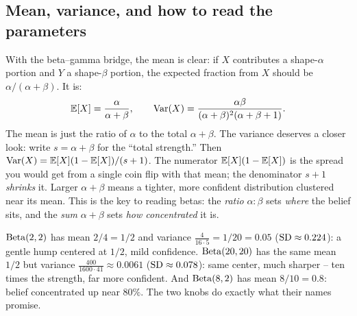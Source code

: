 \subsection{Mean, variance, and how to read the parameters}
With the beta--gamma bridge, the mean is clear: if $X$ contributes a
shape-$\alpha$ portion and $Y$ a shape-$\beta$ portion, the expected fraction
from $X$ should be $\alpha/(\alpha+\beta)$. It is:
\[
  \operatorname{\mathbb{E}}[X] = \frac{\alpha}{\alpha+\beta},
  \qquad
  \operatorname{Var}(X) = \frac{\alpha\beta}{(\alpha+\beta)^2(\alpha+\beta+1)}.
\]
The mean is just the ratio of $\alpha$ to the total $\alpha+\beta$. The variance
deserves a closer look: write $s = \alpha+\beta$ for the ``total strength.'' Then
$\operatorname{Var}(X) = \operatorname{\mathbb{E}}[X](1-\operatorname{\mathbb{E}}[X])/(s+1)$. The numerator $\operatorname{\mathbb{E}}[X](1-\operatorname{\mathbb{E}}[X])$ is the spread
you would get from a single coin flip with that mean; the denominator $s+1$
\emph{shrinks} it. Larger $\alpha+\beta$ means a tighter, more confident
distribution clustered near its mean. This is the key to reading betas: the
\emph{ratio} $\alpha:\beta$ sets \emph{where} the belief sits, and the
\emph{sum} $\alpha+\beta$ sets \emph{how concentrated} it is.
\begin{example}
\label{ch11:ex-readbeta}
$\operatorname{Beta}(2,2)$ has mean $2/4 = 1/2$ and variance
$\frac{4}{16\cdot5} = 1/20 = 0.05$ ($\operatorname{SD}\approx0.224$): a gentle hump centered at
$1/2$, mild confidence. $\operatorname{Beta}(20,20)$ has the same mean $1/2$ but variance
$\frac{400}{1600\cdot41}\approx0.0061$ ($\operatorname{SD}\approx0.078$): same center, much
sharper -- ten times the strength, far more confident. And $\operatorname{Beta}(8,2)$ has mean
$8/10 = 0.8$: belief concentrated up near $80\%$. The two knobs do exactly what
their names promise.
\end{example}
